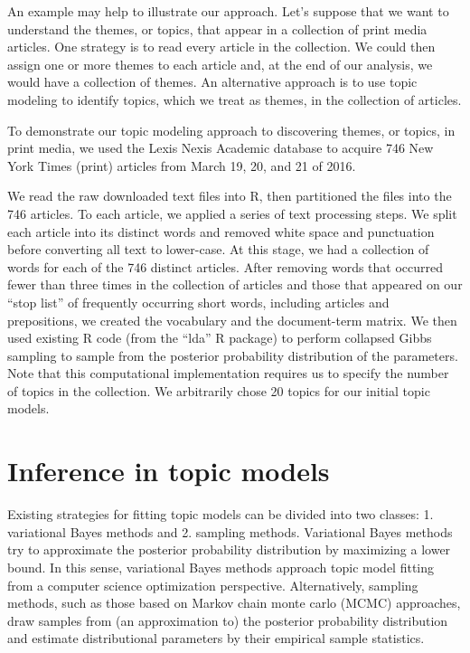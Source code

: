 \documentclass[12pt,]{article}
\begin{document}
An example may help to illustrate our approach. Let's suppose that we
want to understand the themes, or topics, that appear in a collection of
print media articles. One strategy is to read every article in the
collection. We could then assign one or more themes to each article and,
at the end of our analysis, we would have a collection of themes. An
alternative approach is to use topic modeling to identify topics, which
we treat as themes, in the collection of articles.

To demonstrate our topic modeling approach to discovering themes, or
topics, in print media, we used the Lexis Nexis Academic database to
acquire 746 New York Times (print) articles from March 19, 20, and 21 of
2016.

We read the raw downloaded text files into R, then partitioned the files
into the 746 articles. To each article, we applied a series of text
processing steps. We split each article into its distinct words and
removed white space and punctuation before converting all text to
lower-case. At this stage, we had a collection of words for each of the
746 distinct articles. After removing words that occurred fewer than
three times in the collection of articles and those that appeared on our
``stop list'' of frequently occurring short words, including articles
and prepositions, we created the vocabulary and the document-term
matrix. We then used existing R code (from the ``lda'' R package) to
perform collapsed Gibbs sampling to sample from the posterior
probability distribution of the parameters. Note that this computational
implementation requires us to specify the number of topics in the
collection. We arbitrarily chose 20 topics for our initial topic models.

\section{Inference in topic models}\label{inference-in-topic-models}

Existing strategies for fitting topic models can be divided into two
classes: 1. variational Bayes methods and 2. sampling methods.
Variational Bayes methods try to approximate the posterior probability
distribution by maximizing a lower bound. In this sense, variational
Bayes methods approach topic model fitting from a computer science
optimization perspective. Alternatively, sampling methods, such as those
based on Markov chain monte carlo (MCMC) approaches, draw samples from
(an approximation to) the posterior probability distribution and
estimate distributional parameters by their empirical sample statistics.
\end{document}
